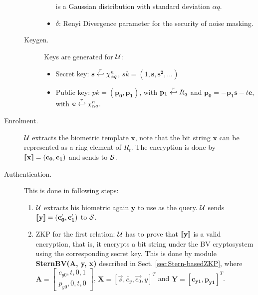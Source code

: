 \begin{description}
\begin{description}
\begin{itemize}
      is a Gaussian distribution with standard deviation $\alpha q$.
    \item \(\delta\): Renyi Divergence parameter for the security of noise masking.
    \end{itemize}
  \item[Keygen.] Keys are generated for $\mathcal{U}$:
    \begin{itemize}
    \item Secret key: $\mathbf{s} \stackrel{r}{\hookleftarrow} \chi_{\alpha q}^n$, \(sk = (1, \mathbf{s, s^{2}, ...})\)
    \item Public key: $pk = \mathbf{(p_0,p_1)}$, with $\mathbf{p_1} \stackrel{r}{\hookleftarrow} R_q$ and
      $\mathbf{p_0} = -\mathbf{p_1s} - t\mathbf{e}$, with $\mathbf{e} \stackrel{r}{\hookleftarrow} \chi_{\alpha q}^n$.
    \end{itemize}
  \end{description}
\item [Enrolment.] $\mathcal{U}$ extracts the biometric template $\mathbf{x}$, note that the bit string $\mathbf{x}$ can be
  represented as a ring element of ${R}_t$.  The encryption is done by $\left\llbracket\mathbf{x}\right\rrbracket = (\mathbf{c_0},\mathbf{c_1})$
  and sends to $\mathcal{S}$.
\item [Authentication.] This is done in following steps:
  \begin{enumerate}
  \item $\mathcal{U}$ extracts his biometric again $\mathbf{y}$ to use as the query. $\mathcal{U}$ sends
    $\left\llbracket\mathbf{y}\right\rrbracket = (\mathbf{c_0', c_1'})$ to $\mathcal{S}$.
  \item ZKP for the first relation: $\mathcal{U}$ has to prove that $\left\llbracket\mathbf{y}\right\rrbracket$ is a valid encryption, that is, it
    encrypts a bit string under the BV cryptosystem using the corresponding secret key. This is done by module
    \textbf{SternBV(A, y, x)} described in Sect. \ref{sec:Stern-basedZKP}, where
    $\mathbf{A} = \begin{bmatrix} c_{y0}, t, 0, 1\\p_{y0}, 0, t, 0
    \end{bmatrix}$, \(\mathbf{X} = [\vec{s},\tilde{e_{y}},\vec{e_{0}},y]^T\) and \(\mathbf{Y
    = [c_{y1},p_{y1}]}^{T}\).


\end{enumerate}
\end{description}
